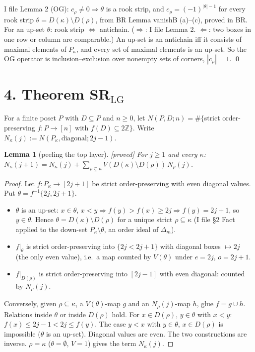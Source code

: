 \documentclass[10pt]{amsart}
\newcommand{\grade}[1]{\textsf{[#1]}}
\newcommand{\LG}{\mathrm{LG}}
\newtheorem{lem}{Lemma}[section]
\theoremstyle{remark}
\begin{document}
I file Lemma 2 (OG): $c_\rho\ne0\Rightarrow\theta$ is a rook strip, and $c_\rho=(-1)^{|\theta|-1}$ for every rook strip
$\theta=D(\kappa)\setminus D(\rho)$, from BR Lemma vanishB (a)--(c), proved in BR. For an up-set $\theta$: rook strip
$\iff$ antichain. ($\Rightarrow$: I file Lemma 2. $\Leftarrow$: two boxes in one row or column are comparable.) An up-set is
an antichain iff it consists of maximal elements of $P_\kappa$, and every set of maximal elements is an up-set. So the OG
operator is inclusion--exclusion over nonempty sets of corners, $|c_\rho|=1$. \qed

\section*{4. Theorem SR$_{\LG}$}

For a finite poset $P$ with $D\subseteq P$ and $n\ge0$, let $N(P,D;n)=\#\{$strict order-preserving $f:P\to[n]$ with
$f(D)\subseteq2\mathbb Z\}$. Write $N_\kappa(j):=N(P_\kappa,\text{diagonal};2j-1)$.

\begin{lem}[peeling the top layer]\label{lem41}\grade{proved}
For $j\ge1$ and every $\kappa$: $N_\kappa(j+1)=N_\kappa(j)+\sum_{\rho\subsetneq\kappa}V(D(\kappa)\setminus D(\rho))\,N_\rho(j)$.
\end{lem}
\begin{proof}
Let $f:P_\kappa\to[2j+1]$ be strict order-preserving with even diagonal values. Put $\theta=f^{-1}\{2j,2j+1\}$.
\begin{itemize}
\item $\theta$ is an up-set: $x\in\theta$, $x<y\Rightarrow f(y)>f(x)\ge2j\Rightarrow f(y)=2j+1$, so $y\in\theta$. Hence
$\theta=D(\kappa)\setminus D(\rho)$ for a unique strict $\rho\subseteq\kappa$ (I file \S2 Fact applied to the down-set
$P_\kappa\setminus\theta$, an order ideal of $\Delta_m$).
\item $f|_\theta$ is strict order-preserving into $\{2j<2j+1\}$ with diagonal boxes $\mapsto2j$ (the only even value), i.e.\
a map counted by $V(\theta)$ under $e=2j$, $o=2j+1$.
\item $f|_{D(\rho)}$ is strict order-preserving into $[2j-1]$ with even diagonal: counted by $N_\rho(j)$.
\end{itemize}
Conversely, given $\rho\subseteq\kappa$, a $V(\theta)$-map $g$ and an $N_\rho(j)$-map $h$, glue $f=g\cup h$. Relations inside
$\theta$ or inside $D(\rho)$ hold. For $x\in D(\rho)$, $y\in\theta$ with $x<y$: $f(x)\le2j-1<2j\le f(y)$. The case $y<x$ with
$y\in\theta$, $x\in D(\rho)$ is impossible ($\theta$ is an up-set). Diagonal values are even. The two constructions are
inverse. $\rho=\kappa$ ($\theta=\emptyset$, $V=1$) gives the term $N_\kappa(j)$.
\end{proof}
\end{document}
